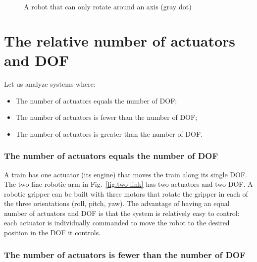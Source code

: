 \begin{figure}
\begin{center}
\end{center}
\caption{A robot that can only rotate around an axis (gray dot)}\label{fig.rot-dof}
\end{figure}

\section{The relative number of actuators and DOF}\label{s.num-actuators}

Let us analyze systems where:
\begin{itemize}
\item The number of actuators equals the number of DOF;
\item The number of actuators is fewer than the number of DOF;
\item The number of actuators is greater than the number of DOF.
\end{itemize}

\subsubsection*{The number of actuators equals the number of DOF}

A train has one actuator (its engine) that moves the train along its single DOF. The two-line robotic arm in Fig.~\ref{fig.two-link} has two actuators and two DOF. A robotic gripper can be built with three motors that rotate the gripper in each of the three orientations (roll, pitch, yaw). The advantage of having an equal number of actuators and DOF is that the system is relatively easy to control: each actuator is individually commanded to move the robot to the desired position in the DOF it controls.

\subsubsection*{The number of actuators is fewer than the number of DOF}

